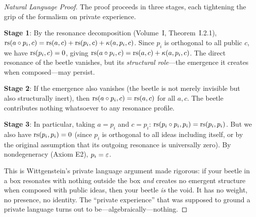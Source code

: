 \begin{proof}[Natural Language Proof]
The proof proceeds in three stages, each tightening the grip of
the formalism on private experience.

\textbf{Stage 1}: By the resonance decomposition (Volume~I, Theorem~I.2.1),
$\mathrm{rs}(a \circ p_i, c) = \mathrm{rs}(a,c) + \mathrm{rs}(p_i, c) + \kappa(a, p_i, c)$.
Since $p_i$ is orthogonal to all public $c$, we have $\mathrm{rs}(p_i, c) = 0$,
giving $\mathrm{rs}(a \circ p_i, c) = \mathrm{rs}(a, c) + \kappa(a, p_i, c)$.
The direct resonance of the beetle vanishes, but its \emph{structural role}---the
emergence it creates when composed---may persist.

\textbf{Stage 2}: If the emergence also vanishes (the beetle is not merely
invisible but also structurally inert), then $\mathrm{rs}(a \circ p_i, c) = \mathrm{rs}(a, c)$
for all $a, c$. The beetle contributes nothing whatsoever to any resonance profile.

\textbf{Stage 3}: In particular, taking $a = p_i$ and $c = p_i$:
$\mathrm{rs}(p_i \circ p_i, p_i) = \mathrm{rs}(p_i, p_i)$. But we also have
$\mathrm{rs}(p_i, p_i) = 0$ (since $p_i$ is orthogonal to all ideas including itself,
or by the original assumption that its outgoing resonance is universally zero).
By nondegeneracy (Axiom E2), $p_i = \varepsilon$.

This is Wittgenstein's private language argument made rigorous: if your beetle
in a box resonates with nothing outside the box \emph{and} creates no emergent
structure when composed with public ideas, then your beetle \emph{is} the void.
It has no weight, no presence, no identity. The ``private experience'' that was
supposed to ground a private language turns out to be---algebraically---nothing.
\end{proof}

